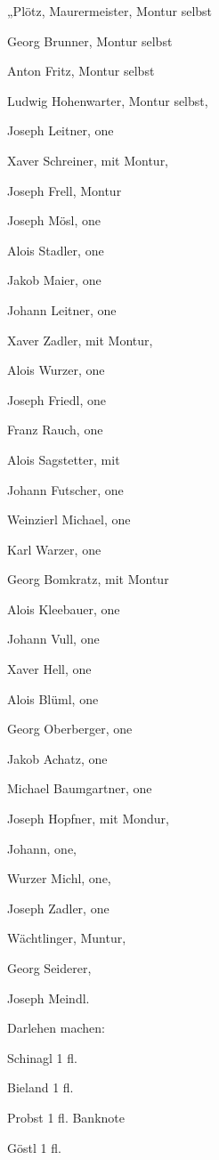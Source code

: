 \documentclass{book}
\begin{document}
„Plötz, Maurermeister, Montur selbst

Georg Brunner, Montur selbst

Anton Fritz, Montur selbst

Ludwig Hohenwarter, Montur selbst,

Joseph Leitner, one

Xaver Schreiner, mit Montur,

Joseph Frell, Montur

Joseph Mösl, one

Alois Stadler, one

Jakob Maier, one

Johann Leitner, one

Xaver Zadler, mit Montur,

Alois Wurzer, one

Joseph Friedl, one

Franz Rauch, one

Alois Sagstetter, mit

Johann Futscher, one

Weinzierl Michael, one

Karl Warzer, one

Georg Bomkratz, mit Montur

Alois Kleebauer, one



Johann Vull, one

Xaver Hell, one

Alois Blüml, one

Georg Oberberger, one

Jakob Achatz, one

Michael Baumgartner, one

Joseph Hopfner, mit Mondur,

Johann, one,

Wurzer Michl, one,

Joseph Zadler, one

Wächtlinger, Muntur,

Georg Seiderer,

Joseph Meindl.







Darlehen machen:



Schinagl 1 fl.

Bieland 1 fl.

Probst 1 fl. Banknote

Göstl 1 fl.
\end{document}
